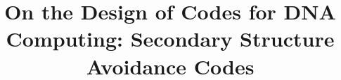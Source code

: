 \documentclass[conference]{IEEEtran}
\theoremstyle{plain}
\theoremstyle{definition}
\newcommand{\GC}{$\mathtt{GC}$}
\begin{document}
\pagestyle{empty}

\title{On the Design of Codes for DNA Computing: Secondary Structure Avoidance Codes\\[-3mm]}

\end{document}
